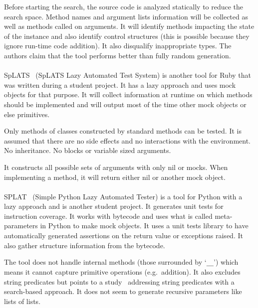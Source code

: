 \documentclass{llncs2e/llncs}
\begin{document}
Before starting the search, the source code is analyzed statically to reduce the
search space. Method names and argument lists information will be collected as
well as methods called on arguments. It will identify methods impacting the
state of the instance and also identify control structures (this is possible
because they ignore run-time code addition). It also disqualify inappropriate
types. The authors claim that the tool performs better than fully random
generation.


\paragraph{} SpLATS~\cite{splats} (SpLATS Lazy Automated Test System) is another
tool for Ruby that was written during a student project. It has a lazy approach
and uses mock objects for that purpose. It will collect information at runtime
on which methods should be implemented and will output most of the time other
mock objects or else primitives.

Only methods of classes constructed by standard methods can be tested. It is
assumed that there are no side effects and no interactions with the environment.
No inheritance. No blocks or variable sized arguments.

It constructs all possible sets of arguments with only nil or mocks. When
implementing a method, it will return either nil or another mock object.

\paragraph{} SPLAT~\cite{splat} (Simple Python Lazy Automated Tester) is a tool
for Python with a lazy approach and is another student project. It generates
unit tests for instruction coverage.  It works with bytecode and uses what is
called meta-parameters in Python to make mock objects. It uses a unit tests
library to have automatically generated assertions on the return value or
exceptions raised. It also gather structure information from the bytecode.

The tool does not handle internal methods (those surrounded by `\texttt{\_\_}')
which means it cannot capture primitive operations (e.g.\ addition). It also
excludes string predicates but points to a study~\cite{alshraideh2006search}
addressing string predicates with a search-based approach. It does not seem to
generate recursive parameters like lists of lists.
\end{document}
